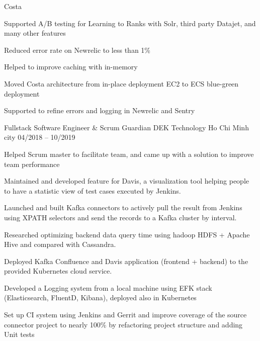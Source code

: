 \begin{cventries}
     \cventry
    {Costa} %
    {} %
    {} %
    {} %
    {
      \begin{cvitems} %
        \item {Supported A/B testing for Learning to Ranks with Solr, third party Datajet, and many other features}
        \item {Reduced error rate on Newrelic to less than 1\%}
        \item {Helped to improve caching with in-memory}
        \item {Moved Costa architecture from in-place deployment EC2 to ECS blue-green deployment}
        \item {Supported to refine errors and logging in Newrelic and Sentry}
      \end{cvitems}
    }

  \cventry
    {Fullstack Software Engineer \& Scrum Guardian} %
    {DEK Technology} %
    {Ho Chi Minh city} %
    {04/2018 -- 10/2019} %
    {
      \begin{cvitems} %
        \item {Helped Scrum master to facilitate team, and came up with a solution to improve team performance}
        \item {Maintained and developed feature for Davis, a visualization tool helping people to have a statistic view of test cases executed by Jenkins.  }
        \item {Launched and built Kafka connectors to actively pull the result from Jenkins using XPATH selectors and send the records to a Kafka cluster by interval.}
        \item {Researched optimizing backend data query time using hadoop HDFS + Apache Hive and compared with Cassandra.}
        \item {Deployed Kafka Confluence and Davis application (frontend + backend) to the provided Kubernetes cloud service.}
        \item {Developed a Logging system from a local machine using EFK stack (Elasticsearch, FluentD, Kibana), deployed also in Kubernetes}
        \item {Set up CI system using Jenkins and Gerrit and improve coverage of the source connector project to nearly 100\% by refactoring project structure and adding Unit tests}
      \end{cvitems}
    }


\end{cventries}
